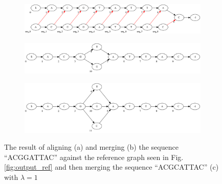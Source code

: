 \documentclass[thesis.tex]{subfiles}
\begin{document}
\begin{figure}[H]
  \begin{subfigure}[t]{\textwidth}
    \begin{mdframed}
      \includegraphics[width=\textwidth]{outputs/snp-alignment.png}
    \end{mdframed}
    \subcaption{}
  \end{subfigure}
  \begin{subfigure}[t]{\textwidth}
    \begin{mdframed}
      \includegraphics[width=\textwidth]{outputs/snp-merge.png}
    \end{mdframed}
    \subcaption{}
  \end{subfigure}
  \begin{subfigure}[t]{\textwidth}
    \begin{mdframed}
      \includegraphics[width=\textwidth]{outputs/snp-merge-two.png}
    \end{mdframed}
    \subcaption{}
  \end{subfigure}
  \caption{The result of aligning (a) and merging (b) the sequence ``ACGGATTAC'' against the reference graph seen in Fig. \ref{fig:output_ref} and then merging the sequence ``ACGCATTAC'' (c) with $\lambda=1$}
  \label{fig:output_snp}
\end{figure}
\end{document}
